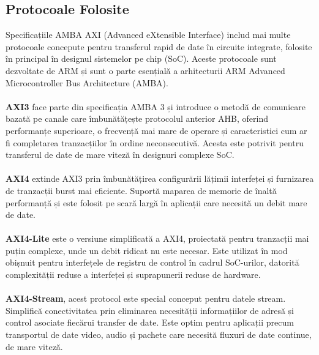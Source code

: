\documentclass[12pt]{article}
\begin{document}
\subsection{Protocoale Folosite}
\hspace*{1cm}Specificațiile AMBA AXI (Advanced eXtensible Interface) includ mai multe protocoale concepute pentru transferul rapid de date în circuite integrate, folosite în principal în designul sistemelor pe chip (SoC). Aceste protocoale sunt dezvoltate de ARM și sunt o parte esențială a arhitecturii ARM Advanced Microcontroller Bus Architecture (AMBA).\\\\
\hspace*{1cm}\textbf{AXI3} face parte din specificația AMBA 3 și introduce o metodă de comunicare bazată pe canale care îmbunătățește protocolul anterior AHB, oferind performanțe superioare, o frecvență mai mare de operare și caracteristici cum ar fi completarea tranzacțiilor în ordine neconsecutivă. Acesta este potrivit pentru transferul de date de mare viteză în designuri complexe SoC.\\\\
\hspace*{1cm}\textbf{AXI4} extinde AXI3 prin îmbunătățirea configurării lățimii interfeței și furnizarea de tranzacții burst mai eficiente. Suportă maparea de memorie de înaltă performanță și este folosit pe scară largă în aplicații care necesită un debit mare de date.\\\\
\hspace*{1cm}\textbf{AXI4-Lite} este o versiune simplificată a AXI4, proiectată pentru tranzacții mai puțin complexe, unde un debit ridicat nu este necesar. Este utilizat în mod obișnuit pentru interfețele de registru de control în cadrul SoC-urilor, datorită complexității reduse a interfeței și suprapunerii reduse de hardware.\\\\
\hspace*{1cm}\textbf{AXI4-Stream}, acest protocol este special conceput pentru datele stream. Simplifică conectivitatea prin eliminarea necesității informațiilor de adresă și control asociate fiecărui transfer de date. Este optim pentru aplicații precum transportul de date video, audio și pachete care necesită fluxuri de date continue, de mare viteză.\\
\end{document}

